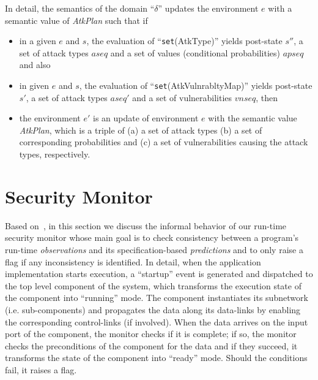\documentclass[conference]{IEEEtran}
\begin{document}
In detail, the semantics of the domain ``$\delta$'' updates the environment $e$ with a semantic value of \emph{AtkPlan} such that if
\begin{itemize}
\item in a given $e$ and $s$, the evaluation of ``\texttt{set}(AtkType)'' yields post-state $s''$, a set of attack types $aseq$ and a set of values (conditional probabilities) $apseq$ and also
\item in given $e$ and $s$, the evaluation of ``\texttt{set}(AtkVulnrabltyMap)'' yields post-state $s'$, a set of attack types $aseq'$ and a set of vulnerabilities $vnseq$, then
\item the environment $e'$ is an update of environment $e$ with the semantic value \emph{AtkPlan}, which is a triple of (a) a set of attack types (b) a set of corresponding probabilities and (c) a set of vulnerabilities causing the attack types, respectively.
\end{itemize}



\section{Security Monitor}\label{sec:ad}
Based on~\cite{Shrobe:2006}, in this section we discuss the informal behavior of our run-time security monitor whose main goal is to check consistency between a program's run-time  \emph{observations} and its specification-based \emph{predictions} and to only raise a flag if any inconsistency is identified. In detail, when the application implementation starts execution, a ``startup'' event is generated and
dispatched to the top level component of the system, which transforms the execution state of the component
into ``running'' mode. The component instantiates its subnetwork (i.e. sub-components) and propagates
the data along its data-links by enabling the corresponding control-links (if involved). When the data arrives on the input port of the component, the monitor checks if it is complete; if so, the monitor checks the preconditions of the component for the data and if they succeed, it transforms the state of the component into ``ready'' mode. Should the conditions fail, it raises a flag.
\end{document}

